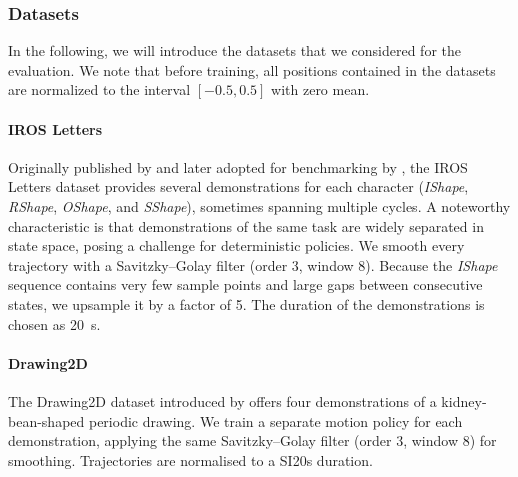 \subsubsection{Datasets}
In the following, we will introduce the datasets that we considered for the evaluation.
We note that before training, all positions contained in the datasets are normalized to the interval $[-0.5, 0.5]$ with zero mean.

\paragraph{IROS Letters}
Originally published by \citet{urain2020imitationflow} and later adopted for benchmarking by \citet{nawaz2024learning}, the IROS Letters dataset provides several demonstrations for each character (\emph{IShape}, \emph{RShape}, \emph{OShape}, and \emph{SShape}), sometimes spanning multiple cycles.
A noteworthy characteristic is that demonstrations of the same task are widely separated in state space, posing a challenge for deterministic policies. We smooth every trajectory with a Savitzky–Golay filter (order 3, window 8). Because the \emph{IShape} sequence contains very few sample points and large gaps between consecutive states, we upsample it by a factor of 5. The duration of the demonstrations is chosen as \SI{20}{s}.

\paragraph{Drawing2D}
The Drawing2D dataset introduced by \citet{nawaz2024learning} offers four demonstrations of a kidney‐bean-shaped periodic drawing. We train a separate motion policy for each demonstration, applying the same Savitzky–Golay filter (order 3, window 8) for smoothing. Trajectories are normalised to a SI{20}{s} duration.


